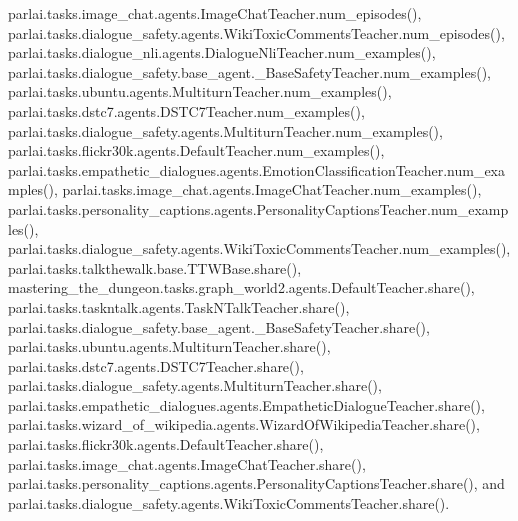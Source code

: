 parlai.\+tasks.\+image\+\_\+chat.\+agents.\+Image\+Chat\+Teacher.\+num\+\_\+episodes(), parlai.\+tasks.\+dialogue\+\_\+safety.\+agents.\+Wiki\+Toxic\+Comments\+Teacher.\+num\+\_\+episodes(), parlai.\+tasks.\+dialogue\+\_\+nli.\+agents.\+Dialogue\+Nli\+Teacher.\+num\+\_\+examples(), parlai.\+tasks.\+dialogue\+\_\+safety.\+base\+\_\+agent.\+\_\+\+Base\+Safety\+Teacher.\+num\+\_\+examples(), parlai.\+tasks.\+ubuntu.\+agents.\+Multiturn\+Teacher.\+num\+\_\+examples(), parlai.\+tasks.\+dstc7.\+agents.\+D\+S\+T\+C7\+Teacher.\+num\+\_\+examples(), parlai.\+tasks.\+dialogue\+\_\+safety.\+agents.\+Multiturn\+Teacher.\+num\+\_\+examples(), parlai.\+tasks.\+flickr30k.\+agents.\+Default\+Teacher.\+num\+\_\+examples(), parlai.\+tasks.\+empathetic\+\_\+dialogues.\+agents.\+Emotion\+Classification\+Teacher.\+num\+\_\+examples(), parlai.\+tasks.\+image\+\_\+chat.\+agents.\+Image\+Chat\+Teacher.\+num\+\_\+examples(), parlai.\+tasks.\+personality\+\_\+captions.\+agents.\+Personality\+Captions\+Teacher.\+num\+\_\+examples(), parlai.\+tasks.\+dialogue\+\_\+safety.\+agents.\+Wiki\+Toxic\+Comments\+Teacher.\+num\+\_\+examples(), parlai.\+tasks.\+talkthewalk.\+base.\+T\+T\+W\+Base.\+share(), mastering\+\_\+the\+\_\+dungeon.\+tasks.\+graph\+\_\+world2.\+agents.\+Default\+Teacher.\+share(), parlai.\+tasks.\+taskntalk.\+agents.\+Task\+N\+Talk\+Teacher.\+share(), parlai.\+tasks.\+dialogue\+\_\+safety.\+base\+\_\+agent.\+\_\+\+Base\+Safety\+Teacher.\+share(), parlai.\+tasks.\+ubuntu.\+agents.\+Multiturn\+Teacher.\+share(), parlai.\+tasks.\+dstc7.\+agents.\+D\+S\+T\+C7\+Teacher.\+share(), parlai.\+tasks.\+dialogue\+\_\+safety.\+agents.\+Multiturn\+Teacher.\+share(), parlai.\+tasks.\+empathetic\+\_\+dialogues.\+agents.\+Empathetic\+Dialogue\+Teacher.\+share(), parlai.\+tasks.\+wizard\+\_\+of\+\_\+wikipedia.\+agents.\+Wizard\+Of\+Wikipedia\+Teacher.\+share(), parlai.\+tasks.\+flickr30k.\+agents.\+Default\+Teacher.\+share(), parlai.\+tasks.\+image\+\_\+chat.\+agents.\+Image\+Chat\+Teacher.\+share(), parlai.\+tasks.\+personality\+\_\+captions.\+agents.\+Personality\+Captions\+Teacher.\+share(), and parlai.\+tasks.\+dialogue\+\_\+safety.\+agents.\+Wiki\+Toxic\+Comments\+Teacher.\+share().

\mbox{\label{classparlai_1_1tasks_1_1dialogue__nli_1_1agents_1_1DialogueNliTeacher_aec219032386350b637684f9ab46a09ab}} 
